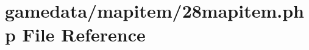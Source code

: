 \hypertarget{28mapitem_8php}{\section{gamedata/mapitem/28mapitem.php File Reference}
\label{28mapitem_8php}
}
